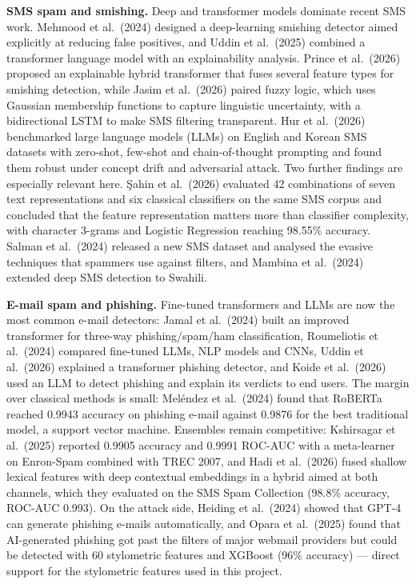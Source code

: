 \documentclass[12pt,a4paper]{report}
\begin{document}
\textbf{SMS spam and smishing.} Deep and transformer models dominate recent
SMS work. Mehmood et al.\ (2024) designed a deep-learning smishing detector
aimed explicitly at reducing false positives, and Uddin et al.\ (2025)
combined a transformer language model with an explainability analysis. Prince
et al.\ (2026) proposed an explainable hybrid transformer that fuses several
feature types for smishing detection, while Jasim et al.\ (2026) paired fuzzy
logic, which uses Gaussian membership functions to capture linguistic
uncertainty, with a bidirectional LSTM to make SMS filtering transparent. Hur
et al.\ (2026) benchmarked large language models (LLMs) on English and Korean
SMS datasets with zero-shot, few-shot and chain-of-thought prompting and found
them robust under concept drift and adversarial attack. Two further findings
are especially relevant here. \c{S}ahin et al.\ (2026) evaluated 42
combinations of seven text representations and six classical classifiers on
the same SMS corpus and concluded that the feature representation matters
more than classifier complexity, with character 3-grams and Logistic
Regression reaching 98.55\% accuracy. Salman et al.\ (2024) released a new SMS
dataset and analysed the evasive techniques that spammers use against
filters, and Mambina et al.\ (2024) extended deep SMS detection to Swahili.

\textbf{E-mail spam and phishing.} Fine-tuned transformers and LLMs are now
the most common e-mail detectors: Jamal et al.\ (2024) built an improved
transformer for three-way phishing/spam/ham classification, Roumeliotis et
al.\ (2024) compared fine-tuned LLMs, NLP models and CNNs, Uddin et al.\ (2026)
explained a transformer phishing detector, and Koide et al.\ (2026) used an
LLM to detect phishing and explain its verdicts to end users. The margin over
classical methods is small: Mel\'{e}ndez et al.\ (2024) found that RoBERTa
reached 0.9943 accuracy on phishing e-mail against 0.9876 for the best
traditional model, a support vector machine. Ensembles remain competitive:
Kshirsagar et al.\ (2025) reported 0.9905 accuracy and 0.9991 ROC-AUC with a
meta-learner on Enron-Spam combined with TREC 2007, and Hadi et al.\ (2026)
fused shallow lexical features with deep contextual embeddings in a hybrid
aimed at both channels, which they evaluated on the SMS Spam Collection
(98.8\% accuracy, ROC-AUC 0.993). On the attack side, Heiding et al.\ (2024)
showed that GPT-4 can generate phishing e-mails automatically, and Opara et
al.\ (2025) found that AI-generated phishing got past the filters of major
webmail providers but could be detected with 60 stylometric features and
XGBoost (96\% accuracy) --- direct support for the stylometric features used
in this project.
\end{document}
